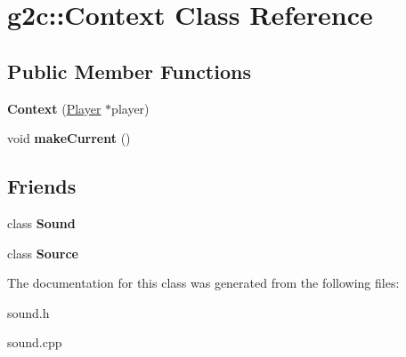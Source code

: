 \hypertarget{classg2c_1_1_context}{
\section{g2c::Context Class Reference}
\label{classg2c_1_1_context}
}
\subsection*{Public Member Functions}
\begin{DoxyCompactItemize}
\item 
\hypertarget{classg2c_1_1_context_ab8f6f307b7e213c10047faa3446d8b46}{
{\bfseries Context} (\hyperlink{classg2c_1_1_player}{Player} $\ast$player)}
\label{classg2c_1_1_context_ab8f6f307b7e213c10047faa3446d8b46}

\item 
\hypertarget{classg2c_1_1_context_ade254ad4d223f8d57aa0cfb3f2d61769}{
void {\bfseries makeCurrent} ()}
\label{classg2c_1_1_context_ade254ad4d223f8d57aa0cfb3f2d61769}

\end{DoxyCompactItemize}
\subsection*{Friends}
\begin{DoxyCompactItemize}
\item 
\hypertarget{classg2c_1_1_context_a50914f77c7cf4fb97616c898c5291f4b}{
class {\bfseries Sound}}
\label{classg2c_1_1_context_a50914f77c7cf4fb97616c898c5291f4b}

\item 
\hypertarget{classg2c_1_1_context_afec7d2c89abca6ba2f2278a4ec21fc00}{
class {\bfseries Source}}
\label{classg2c_1_1_context_afec7d2c89abca6ba2f2278a4ec21fc00}

\end{DoxyCompactItemize}


The documentation for this class was generated from the following files:\begin{DoxyCompactItemize}
\item 
sound.h\item 
sound.cpp\end{DoxyCompactItemize}
